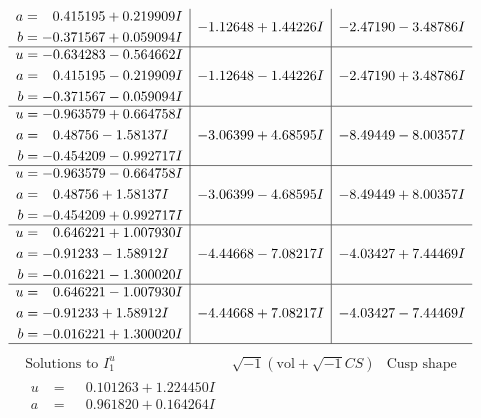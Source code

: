 \documentclass[1p]{elsarticle_modified}
\theoremstyle{definition}
\newcommand{\I}{\sqrt{-1}}
\begin{document}
$$\begin{array}{c|c|c}
\begin{aligned}
a &= \phantom{-}0.415195 + 0.219909 I \\
b &= -0.371567 + 0.059094 I\end{aligned}
 & -1.12648 + 1.44226 I & -2.47190 - 3.48786 I \\ \hline\begin{aligned}
u &= -0.634283 - 0.564662 I \\
a &= \phantom{-}0.415195 - 0.219909 I \\
b &= -0.371567 - 0.059094 I\end{aligned}
 & -1.12648 - 1.44226 I & -2.47190 + 3.48786 I \\ \hline\begin{aligned}
u &= -0.963579 + 0.664758 I \\
a &= \phantom{-}0.48756 - 1.58137 I \\
b &= -0.454209 - 0.992717 I\end{aligned}
 & -3.06399 + 4.68595 I & -8.49449 - 8.00357 I \\ \hline\begin{aligned}
u &= -0.963579 - 0.664758 I \\
a &= \phantom{-}0.48756 + 1.58137 I \\
b &= -0.454209 + 0.992717 I\end{aligned}
 & -3.06399 - 4.68595 I & -8.49449 + 8.00357 I \\ \hline\begin{aligned}
u &= \phantom{-}0.646221 + 1.007930 I \\
a &= -0.91233 - 1.58912 I \\
b &= -0.016221 - 1.300020 I\end{aligned}
 & -4.44668 - 7.08217 I & -4.03427 + 7.44469 I \\ \hline\begin{aligned}
u &= \phantom{-}0.646221 - 1.007930 I \\
a &= -0.91233 + 1.58912 I \\
b &= -0.016221 + 1.300020 I\end{aligned}
 & -4.44668 + 7.08217 I & -4.03427 - 7.44469 I\\
 \hline 
 \end{array}$$\newpage$$\begin{array}{c|c|c}  
\text{Solutions to }I^u_{1}& \I (\text{vol} + \sqrt{-1}CS) & \text{Cusp shape}\\
 \hline 
\begin{aligned}
u &= \phantom{-}0.101263 + 1.224450 I \\
a &= \phantom{-}0.961820 + 0.164264 I \\

\end{aligned}
\end{array}$$
\end{document}
